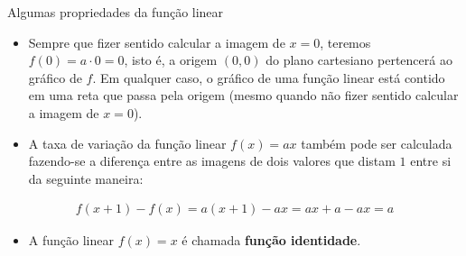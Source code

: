 \begin{observation}{Algumas propriedades da função linear}


\begin{itemize}
\item {} 
Sempre que fizer sentido calcular a imagem de \(x=0\), teremos \(f(0)=a \cdot 0 = 0\), isto é, a origem \((0,0)\) do plano cartesiano pertencerá ao gráfico de \(f\). Em qualquer caso, o gráfico de uma função linear está contido em uma reta que passa pela origem (mesmo quando não fizer sentido calcular a imagem de \(x=0\)).

\item {} 
A taxa de variação da função linear \(f(x)=ax\) também pode ser calculada fazendo-se a diferença entre as imagens de dois valores que distam \(1\) entre si da seguinte maneira:

\end{itemize}
\begin{equation*}
\begin{split}f(x+1)-f(x)=a(x+1)-ax=ax+a-ax=a\end{split}
\end{equation*}

\begin{figure}[H]
\centering

\end{figure}

\begin{itemize}
\item {} 
A função linear $f(x)=x$ é chamada \textbf{função identidade}.

\begin{figure}[H]
\centering

\begin{tikzpicture}[scale=0.5, every node/.style={scale=0.7}]


\end{tikzpicture}
\end{figure}
\end{itemize}
\end{observation}
